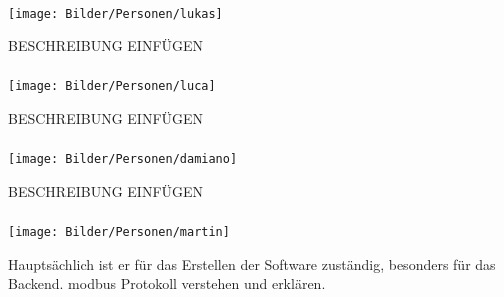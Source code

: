 \paragraph{\fenkart}
\begin{minipage}{0.37\textwidth}
	\centering
	\texttt{[image: Bilder/Personen/lukas]}
\end{minipage}
\hfill
\begin{minipage}{0.6\textwidth}
	BESCHREIBUNG EINFÜGEN
\end{minipage}%
\vspace{1ex}

\paragraph{\mangeng}
\begin{minipage}{0.37\textwidth}
	\centering
	\texttt{[image: Bilder/Personen/luca]}
\end{minipage}
\hfill
\begin{minipage}{0.6\textwidth}
	BESCHREIBUNG EINFÜGEN
\end{minipage}%
\vspace{1ex}

\paragraph{\pezze}
\begin{minipage}{0.37\textwidth}
	\centering
	\texttt{[image: Bilder/Personen/damiano]}
\end{minipage}
\hfill
\begin{minipage}{0.6\textwidth}
	BESCHREIBUNG EINFÜGEN
\end{minipage}%
\vspace{1ex}

\paragraph{\schneider}
\begin{minipage}{0.37\textwidth}
	\centering
	\texttt{[image: Bilder/Personen/martin]}
\end{minipage}
\hfill
\begin{minipage}{0.6\textwidth}
	Hauptsächlich ist er für das Erstellen der Software zuständig, besonders für das Backend. \gls{modbus} Protokoll verstehen und erklären. 
\end{minipage}%
\vspace{1ex}

